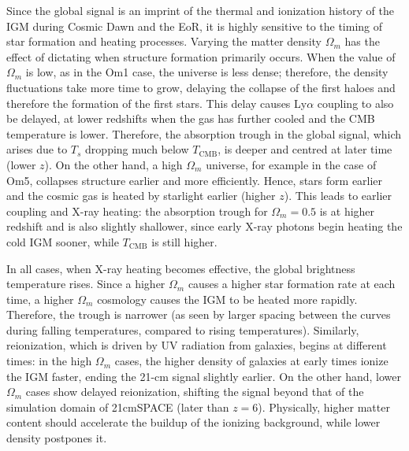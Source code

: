 \documentclass[floats,floatfix,showpacs,amssymb,prd,superscriptaddress,nofootinbib]{revtex4-2} %
\begin{document}

Since the global signal is an imprint of the thermal and ionization history of the IGM during Cosmic Dawn and the EoR, it is highly sensitive to the timing of star formation and heating processes. Varying the matter density $\Omega_m$ has the effect of dictating when structure formation primarily occurs. When the value of $\Omega_m$ is low, as in the Om1 case, the universe is less dense; therefore, the density fluctuations take more time to grow, delaying the collapse of the first haloes and therefore the formation of the first stars. This delay causes Ly$\alpha$ coupling to also be delayed, at lower redshifts when the gas has further cooled and the CMB temperature is lower. Therefore, the absorption trough in the global signal, which arises due to $T_s$ dropping much below $T_\text{CMB}$, is deeper and centred at later time (lower $z$). On the other hand, a high $\Omega_m$ universe, for example in the case of Om5, collapses structure earlier and more efficiently. Hence, stars form earlier and the cosmic gas is heated by starlight earlier (higher $z$). This leads to earlier coupling and X-ray heating: the absorption trough for $\Omega_m = 0.5$ is at higher redshift and is also slightly shallower, since early X-ray photons begin heating the cold IGM sooner, while $T_\text{CMB}$ is still higher. 

In all cases, when X-ray heating becomes effective, the global brightness temperature rises. Since a higher $\Omega_m$ causes a higher star formation rate at each time, a higher $\Omega_m$ cosmology causes the IGM to be heated more rapidly. Therefore, the trough is narrower (as seen by larger spacing between the curves during falling temperatures, compared to rising temperatures). Similarly, reionization, which is driven by UV radiation from galaxies, begins at different times: in the high $\Omega_m$ cases, the higher density of galaxies at early times ionize the IGM faster, ending the 21-cm signal slightly earlier. On the other hand, lower $\Omega_m$ cases show delayed reionization, shifting the signal beyond that of the simulation domain of 21cmSPACE (later than $z = 6$). Physically, higher matter content should accelerate the buildup of the ionizing background, while lower density postpones it.
\end{document}
